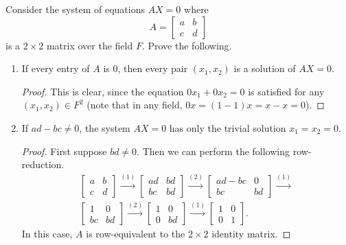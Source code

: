  Consider the system of equations $AX = 0$ where
\begin{equation*}
  A =
  \begin{bmatrix}
    a & b \\
    c & d
  \end{bmatrix}
\end{equation*}
is a $2\times2$ matrix over the field $F$. Prove the following.
\begin{enumerate}
\item If every entry of $A$ is $0$, then every pair $(x_1,x_2)$ is a
  solution of $AX = 0$.
  \begin{proof}
    This is clear, since the equation $0x_1 + 0x_2 = 0$ is satisfied
    for any $(x_1,x_2)\in F^2$ (note that in any field,
    $0x = (1 - 1)x = x - x = 0$).
  \end{proof}
\item If $ad - bc \neq 0$, the system $AX = 0$ has only the trivial
  solution $x_1 = x_2 = 0$.
  \begin{proof}
    First suppose $bd\neq0$. Then we can perform
    the following row-reduction.
    \begin{gather*}
      \begin{bmatrix}
        a & b \\
        c & d
      \end{bmatrix}
      \xrightarrow{(1)}
      \begin{bmatrix}
        ad & bd \\
        bc & bd
      \end{bmatrix}
      \xrightarrow{(2)}
      \begin{bmatrix}
        ad - bc & 0 \\
        bc & bd
      \end{bmatrix}
      \xrightarrow{(1)} \\
      \begin{bmatrix}
        1 & 0 \\
        bc & bd
      \end{bmatrix}
      \xrightarrow{(2)}
      \begin{bmatrix}
        1 & 0 \\
        0 & bd
      \end{bmatrix}
      \xrightarrow{(1)}
      \begin{bmatrix}
        1 & 0 \\
        0 & 1
      \end{bmatrix}.
    \end{gather*}
    In this case, $A$ is row-equivalent to the $2\times2$ identity
    matrix.


\end{proof}
\end{enumerate}
